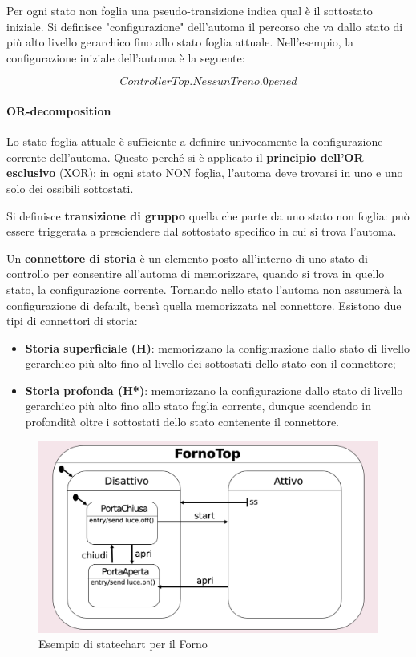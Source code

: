 Per ogni stato non foglia una pseudo-transizione indica qual è il sottostato iniziale. Si definisce "configurazione" dell'automa il percorso che va dallo stato di più alto livello gerarchico fino allo stato foglia attuale. Nell'esempio, la configurazione iniziale dell'automa è la seguente:

$$ControllerTop.NessunTreno.0pened$$

\paragraph{OR-decomposition} Lo stato foglia attuale è sufficiente a definire univocamente la configurazione corrente dell'automa. Questo perché si è applicato il \textbf{principio dell'OR esclusivo} (XOR): in ogni stato NON foglia, l'automa deve trovarsi in uno e uno solo dei ossibili sottostati.

Si definisce \textbf{transizione di gruppo} quella che parte da uno stato non foglia: può essere triggerata a presciendere dal sottostato specifico in cui si trova l'automa. 

Un \textbf{connettore di storia} è un elemento posto all'interno di uno stato di controllo per consentire all'automa di memorizzare, quando si trova in quello stato, la configurazione corrente. Tornando nello stato l'automa non assumerà la configurazione di default, bensì quella memorizzata nel connettore. Esistono due tipi di connettori di storia:
\begin{itemize}
    \item \textbf{Storia superficiale (H)}: memorizzano la configurazione dallo stato di livello gerarchico più alto fino al livello dei sottostati dello stato con il connettore;
    \item \textbf{Storia profonda (H*)}: memorizzano la configurazione dallo stato di livello gerarchico più alto fino allo stato foglia corrente, dunque scendendo in profondità oltre i sottostati dello stato contenente il connettore.
\end{itemize}

\begin{figure}[h!]
    \centering
    \includegraphics[width=0.75\linewidth]{assets/UML/state/state5.png}
    \caption{Esempio di statechart per il Forno}
\end{figure}

